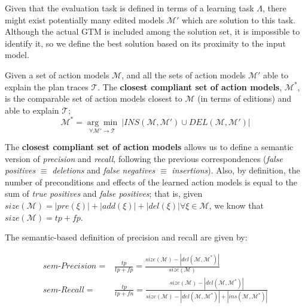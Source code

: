 
Given that the evaluation task is defined in terms of a learning task $\Lambda$, there might exist potentially many edited models $\mathcal{M'}$ which are solution to this task. Although the actual GTM is included among the solution set, it is impossible to identify it, so we define the best solution based on its proximity to the input model.

\begin{mydefinition}
  Given a set of action models $\mathcal{M}$, and all the sets of action models $\mathcal{M'}$ able to explain the plan traces $\mathcal{T}$. The {\bf closest compliant set of action models}, $\mathcal{M^*}$, is the comparable set of action models closest to $\mathcal{M}$ (in terms of editions) and able to explain $\mathcal{T}$;
  \[\mathcal{M^*}=\underset{\forall \mathcal{M}' \rightarrow \mathcal{T}}{\arg\min} \ \left| INS(\mathcal{M},\mathcal{M'}) \cup DEL(\mathcal{M},\mathcal{M'}) \right|\]
\end{mydefinition}

The {\bf closest compliant set of action models} allows us to define a semantic version of {\em precision} and {\em recall}, following the previous correspondences ({\em false positives} $\equiv$ {\em deletions} and {\em false negatives} $\equiv$ {\em insertions}). Also, by definition, the number of preconditions and effects of the learned action models is equal to the sum of {\em true positives} and {\em false positives}; that is, given $size(\mathcal{M}) = \left|pre(\xi)\right| + \left|add(\xi)\right| + \left|del(\xi)\right| \forall \xi \in \mathcal{M}$, we know that $size(\mathcal{M}) = tp + fp$.

The semantic-based definition of precision and recall are given by:

\begin{small}
	\begin{align*}
	sem\text{-}Precision=&\frac{tp}{tp + fp}=\frac{size(\mathcal{M})- \left|del(\mathcal{M},\mathcal{M^*})\right|}{size(\mathcal{M})}\\
	sem\text{-}Recall=&\frac{tp}{tp + fn}=\frac{size(\mathcal{M})- \left|del(\mathcal{M},\mathcal{M^*})\right|}{size(\mathcal{M}) - \left|del(\mathcal{M},\mathcal{M^*})\right| + \left|ins(\mathcal{M},\mathcal{M^*})\right|}
	\end{align*}
\end{small}


